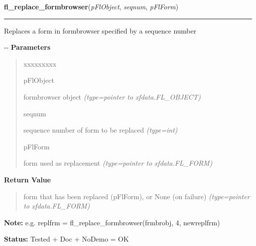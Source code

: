     \label{xformslib:flformbrowser:fl_replace_formbrowser}

    \vspace{0.5ex}

\hspace{.8\funcindent}\begin{boxedminipage}{\funcwidth}

    \raggedright \textbf{fl\_replace\_formbrowser}(\textit{pFlObject}, \textit{seqnum}, \textit{pFlForm})

    \vspace{-1.5ex}

    \rule{\textwidth}{0.5\fboxrule}
\setlength{\parskip}{2ex}

Replaces a form in formbrowser specified by a sequence number

-{}-
\setlength{\parskip}{1ex}
      \textbf{Parameters}
      \vspace{-1ex}

      \begin{quote}
        \begin{Ventry}{xxxxxxxxx}

          \item[pFlObject]


formbrowser object
            {\it (type=pointer to xfdata.FL\_OBJECT)}

          \item[seqnum]


sequence number of form to be replaced
            {\it (type=int)}

          \item[pFlForm]


form used as replacement
            {\it (type=pointer to xfdata.FL\_FORM)}

        \end{Ventry}

      \end{quote}

      \textbf{Return Value}
    \vspace{-1ex}

      \begin{quote}

form that has been replaced (pFlForm), or None (on failure)
      {\it (type=pointer to xfdata.FL\_FORM)}

      \end{quote}

\textbf{Note:} 
e.g. replfrm = fl\_replace\_formbrowser(frmbrobj, 4, newreplfrm)


\textbf{Status:} 
Tested + Doc + NoDemo = OK


    \end{boxedminipage}

